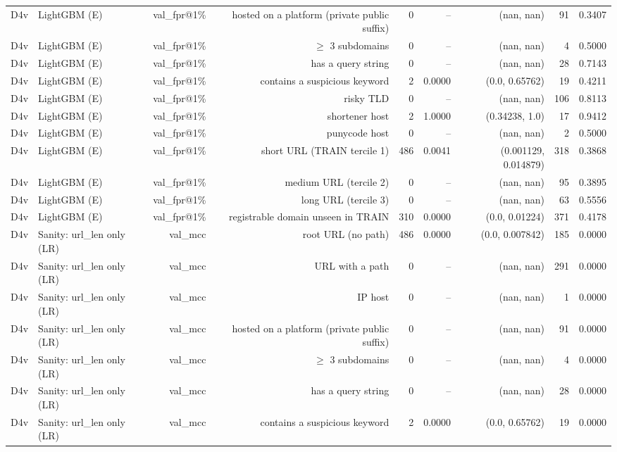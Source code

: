 \begin{table}[t]
\begin{tabular}{llrrrrrrr}
D4v & LightGBM (E) & val\_fpr@1\% & hosted on a platform (private public suffix) & 0 & -- & (nan, nan) & 91 & 0.3407 \\
D4v & LightGBM (E) & val\_fpr@1\% & $\geq$ 3 subdomains & 0 & -- & (nan, nan) & 4 & 0.5000 \\
D4v & LightGBM (E) & val\_fpr@1\% & has a query string & 0 & -- & (nan, nan) & 28 & 0.7143 \\
D4v & LightGBM (E) & val\_fpr@1\% & contains a suspicious keyword & 2 & 0.0000 & (0.0, 0.65762) & 19 & 0.4211 \\
D4v & LightGBM (E) & val\_fpr@1\% & risky TLD & 0 & -- & (nan, nan) & 106 & 0.8113 \\
D4v & LightGBM (E) & val\_fpr@1\% & shortener host & 2 & 1.0000 & (0.34238, 1.0) & 17 & 0.9412 \\
D4v & LightGBM (E) & val\_fpr@1\% & punycode host & 0 & -- & (nan, nan) & 2 & 0.5000 \\
D4v & LightGBM (E) & val\_fpr@1\% & short URL (TRAIN tercile 1) & 486 & 0.0041 & (0.001129, 0.014879) & 318 & 0.3868 \\
D4v & LightGBM (E) & val\_fpr@1\% & medium URL (tercile 2) & 0 & -- & (nan, nan) & 95 & 0.3895 \\
D4v & LightGBM (E) & val\_fpr@1\% & long URL (tercile 3) & 0 & -- & (nan, nan) & 63 & 0.5556 \\
D4v & LightGBM (E) & val\_fpr@1\% & registrable domain unseen in TRAIN & 310 & 0.0000 & (0.0, 0.01224) & 371 & 0.4178 \\
D4v & Sanity: url\_len only (LR) & val\_mcc & root URL (no path) & 486 & 0.0000 & (0.0, 0.007842) & 185 & 0.0000 \\
D4v & Sanity: url\_len only (LR) & val\_mcc & URL with a path & 0 & -- & (nan, nan) & 291 & 0.0000 \\
D4v & Sanity: url\_len only (LR) & val\_mcc & IP host & 0 & -- & (nan, nan) & 1 & 0.0000 \\
D4v & Sanity: url\_len only (LR) & val\_mcc & hosted on a platform (private public suffix) & 0 & -- & (nan, nan) & 91 & 0.0000 \\
D4v & Sanity: url\_len only (LR) & val\_mcc & $\geq$ 3 subdomains & 0 & -- & (nan, nan) & 4 & 0.0000 \\
D4v & Sanity: url\_len only (LR) & val\_mcc & has a query string & 0 & -- & (nan, nan) & 28 & 0.0000 \\
D4v & Sanity: url\_len only (LR) & val\_mcc & contains a suspicious keyword & 2 & 0.0000 & (0.0, 0.65762) & 19 & 0.0000 \\

\end{tabular}
\end{table}
